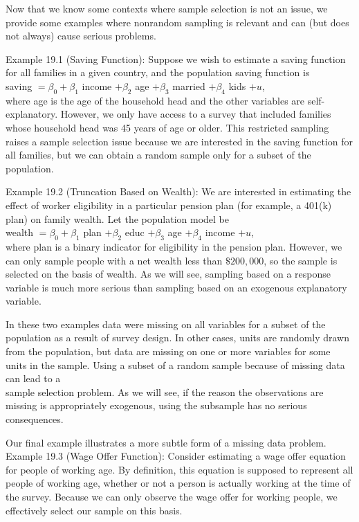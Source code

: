 \documentclass[10pt]{article}
\begin{document}
Now that we know some contexts where sample selection is not an issue, we provide some examples where nonrandom sampling is relevant and can (but does not always) cause serious problems.

Example 19.1 (Saving Function): Suppose we wish to estimate a saving function for all families in a given country, and the population saving function is\\
saving $=\beta_{0}+\beta_{1}$ income $+\beta_{2}$ age $+\beta_{3}$ married $+\beta_{4}$ kids $+u$,\\
where age is the age of the household head and the other variables are self-explanatory. However, we only have access to a survey that included families whose household head was 45 years of age or older. This restricted sampling raises a sample selection issue because we are interested in the saving function for all families, but we can obtain a random sample only for a subset of the population.

Example 19.2 (Truncation Based on Wealth): We are interested in estimating the effect of worker eligibility in a particular pension plan (for example, a 401(k) plan) on family wealth. Let the population model be\\
wealth $=\beta_{0}+\beta_{1}$ plan $+\beta_{2}$ educ $+\beta_{3}$ age $+\beta_{4}$ income $+u$,\\
where plan is a binary indicator for eligibility in the pension plan. However, we can only sample people with a net wealth less than $\$ 200,000$, so the sample is selected on the basis of wealth. As we will see, sampling based on a response variable is much more serious than sampling based on an exogenous explanatory variable.

In these two examples data were missing on all variables for a subset of the population as a result of survey design. In other cases, units are randomly drawn from the population, but data are missing on one or more variables for some units in the sample. Using a subset of a random sample because of missing data can lead to a\\
sample selection problem. As we will see, if the reason the observations are missing is appropriately exogenous, using the subsample has no serious consequences.

Our final example illustrates a more subtle form of a missing data problem.\\
Example 19.3 (Wage Offer Function): Consider estimating a wage offer equation for people of working age. By definition, this equation is supposed to represent all people of working age, whether or not a person is actually working at the time of the survey. Because we can only observe the wage offer for working people, we effectively select our sample on this basis.
\end{document}
